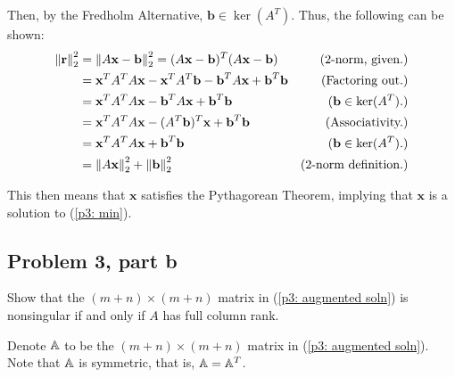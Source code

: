 \begin{solution}
\begin{itemize}
\begin{itemize}
            Then, by the Fredholm Alternative, $\textbf{b} \in \ker(A^T)$. Thus, the following can be shown:
            \alignbreak
            \begin{align}
                \norm{\textbf{r}}_2^2 &= \norm{A\textbf{x} - \textbf{b}}_2^2 = (A\textbf{x} - \textbf{b})^T(A\textbf{x} - \textbf{b}) &\text{(2-norm, given.)}\nonumber\\
                &= \textbf{x}^TA^TA\textbf{x} - \textbf{x}^TA^T\textbf{b} - \textbf{b}^TA\textbf{x} + \textbf{b}^T\textbf{b} &\text{(Factoring out.)}\nonumber\\
                &= \textbf{x}^TA^TA\textbf{x}  - \textbf{b}^TA\textbf{x} + \textbf{b}^T\textbf{b} &(\textbf{b} \in \ker(A^T).)\nonumber\\
                &= \textbf{x}^TA^TA\textbf{x}  - (A^T\textbf{b})^T\textbf{x} + \textbf{b}^T\textbf{b} &\text{(Associativity.)}\nonumber\\
                &= \textbf{x}^TA^TA\textbf{x} + \textbf{b}^T\textbf{b} &(\textbf{b} \in \ker(A^T).)\nonumber\\
                &= \norm{A\textbf{x}}_2^2 + \norm{\textbf{b}}_2^2 &\text{(2-norm definition.)}\nonumber
            \end{align}
            \alignbreak

            This then means that $\textbf{x}$ satisfies the Pythagorean Theorem, implying that $\textbf{x}$ is a solution to (\ref{p3: min}). 
        \end{itemize}
    \end{itemize}
\end{solution}

\newpage
\subsection{Problem 3, part b}
Show that the $(m + n) \times (m + n)$ matrix in (\ref{p3: augmented soln}) is nonsingular if and only if $A$ has full column rank.
\partbreak
\begin{solution}

    Denote $\mathbb{A}$ to be the $(m + n) \times (m + n)$ matrix in (\ref{p3: augmented soln}). Note that $\mathbb{A}$ is symmetric, that is, $\mathbb{A} = \mathbb{A}^T$.
\end{solution}
